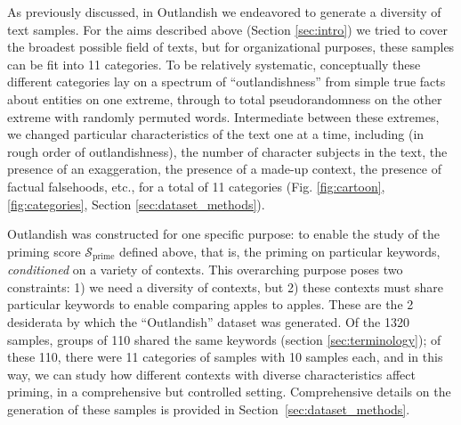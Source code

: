 \documentclass[11pt, a4paper, logo, copyright]{googledeepmind}
\theoremstyle{plain}
\theoremstyle{definition}
\theoremstyle{remark}
\begin{document}
\label{sec:dataset}

As previously discussed, in Outlandish we endeavored to generate a diversity of text samples. For the aims described above (Section \ref{sec:intro}) we tried to cover the broadest possible field of texts, but for organizational purposes, these samples can be fit into 11 categories. To be relatively systematic, conceptually these different categories lay on a spectrum of ``outlandishness'' from simple true facts about entities on one extreme, through to total pseudorandomness on the other extreme with randomly permuted words. Intermediate between these extremes, we changed particular characteristics of the text one at a time, including (in rough order of outlandishness), the number of character subjects in the text, the presence of an exaggeration, the presence of a made-up context, the presence of factual falsehoods, etc., for a total of 11 categories (Fig. \ref{fig:cartoon}, \ref{fig:categories}, Section \ref{sec:dataset_methods}). 


Outlandish was constructed for one specific purpose: to enable the study of the priming score $\mathcal{S}_\text{prime}$ defined above, that is, the priming on particular keywords, \textit{conditioned} on a variety of contexts. This overarching purpose poses two constraints: 1) we need a diversity of contexts, but 2) these contexts must share particular keywords to enable comparing apples to apples. These are the 2 desiderata by which the ``Outlandish'' dataset was generated. Of the 1320 samples, groups of 110 shared the same keywords (section \ref{sec:terminology}); of these 110, there were 11 categories of samples with 10 samples each, and in this way, we can study how different contexts with diverse characteristics affect priming, in a comprehensive but controlled setting. Comprehensive details on the generation of these samples is provided in Section~\ref{sec:dataset_methods}. 

\end{document}
